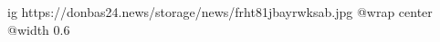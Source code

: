  
 
 
 
 

\ifcmt
  ig https://donbas24.news/storage/news/frht81jbayrwksab.jpg
  @wrap center
  @width 0.6
\fi
